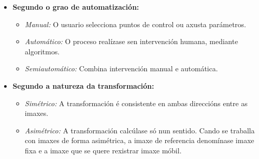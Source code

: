 \begin{itemize}
    \item \textbf{Segundo o grao de automatización:} \cite{deeplernreview3dreg}
    \begin{itemize}
        \item \textit{Manual:} O usuario selecciona puntos de control ou axusta parámetros.
        \item \textit{Automático:} O proceso realízase sen intervención humana, mediante algoritmos.
        \item \textit{Semiautomático:} Combina intervención manual e automática.
    \end{itemize}

    \item \textbf{Segundo a natureza da transformación:}
    \begin{itemize}
        \item \textit{Simétrico:} A transformación é consistente en ambas direccións entre as imaxes.
        \item \textit{Asimétrico:} A transformación calcúlase só nun sentido. Cando se traballa con imaxes de forma asimétrica, a imaxe de referencia denomínase imaxe fixa e a imaxe que se quere rexistrar imaxe móbil.
    \end{itemize}

\end{itemize}

        
